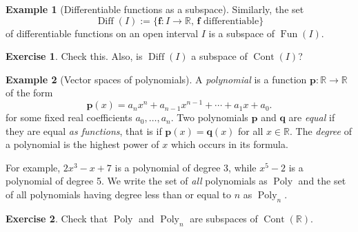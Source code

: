 \documentclass[a4paper,11pt]{book}
\theoremstyle{definition}
\newtheorem{exercise}{Exercise}
\newtheorem{example_environment}{Example}[chapter]
\newcommand{\be}{\begin{equation}}
\newcommand{\ee}{\end{equation}}
\newcommand{\ve}[1]{\mathbf{#1}}
\newenvironment{example}
	{
		\begin{oframed} 
		\begin{example_environment}
	}
	{
		\end{example_environment}
		\end{oframed}
	}
\DeclareMathOperator{\Fun}{Fun}
\DeclareMathOperator{\Cont}{Cont}
\DeclareMathOperator{\Diff}{Diff}
\DeclareMathOperator{\Poly}{Poly}
\begin{document}
\begin{example}[Differentiable functions as a subspace] Similarly, the set
\[
 \Diff(I) := \{ \ve{f}: I \rightarrow \mathbb{R}, \, \ve{f} \mbox{ differentiable} \}
 \]
of differentiable functions on an open interval $I$ is a subspace of $\Fun (I)$. 
\begin{exercise} Check this. Also, is $\Diff( I)$ a subspace of $\Cont(I)$?
\end{exercise}
\end{example}

\begin{example}[Vector spaces of polynomials]
 A {\em polynomial} is a function $\ve{p} : \mathbb{R} \rightarrow \mathbb{R}$ of the form
\be
 \ve{p}(x) = a_n x^n + a_{n-1}x^{n-1} + \cdots + a_1 x + a_0. \label{formula_poly}
\ee
for some fixed real coefficients $a_0, \ldots, a_n$. Two polynomials $\ve{p}$ and $\ve{q}$ are {\em equal} if they are equal {\em as functions}, that is if $\ve{p}(x) = \ve{q} (x)$ for all $x \in \mathbb{R}$. The {\em degree} of a polynomial is the highest power of $x$ which occurs in its formula.

For example, $2x^3 - x + 7$ is a polynomial of degree 3, while $x^5 - 2$ is a polynomial of degree 5. 
 We write the set of {\em all} polynomials as $\Poly$ and the set of all polynomials having degree less than or equal to $n$ as $\Poly_n$.

\begin{exercise} Check that $\Poly$ and $\Poly_n$ are subspaces of $\Cont (\mathbb{R})$.
\end{exercise}
\end{example} 
\end{document}
